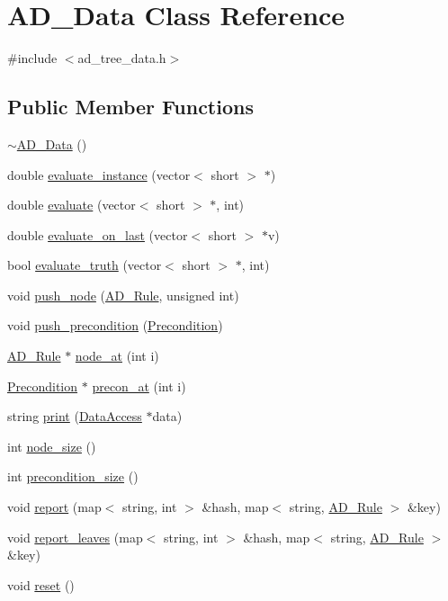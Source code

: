 \hypertarget{classAD__Data}{
\section{AD\_\-Data Class Reference}
\label{classAD__Data}
}


{\ttfamily \#include $<$ad\_\-tree\_\-data.h$>$}

\subsection*{Public Member Functions}
\begin{DoxyCompactItemize}
\item 
\hyperlink{classAD__Data_a57f2d885255d7c1cc4a58ef0b25dc70f}{$\sim$AD\_\-Data} ()
\item 
double \hyperlink{classAD__Data_a27ee25978ea9544be17a0d63a2381cce}{evaluate\_\-instance} (vector$<$ short $>$ $\ast$)
\item 
double \hyperlink{classAD__Data_ad4c7e18955e518adb3816ad59929a3f5}{evaluate} (vector$<$ short $>$ $\ast$, int)
\item 
double \hyperlink{classAD__Data_a579358913b3809af2c7eed5df350d4da}{evaluate\_\-on\_\-last} (vector$<$ short $>$ $\ast$v)
\item 
bool \hyperlink{classAD__Data_a69c88748173e40b02bf2982716a0c324}{evaluate\_\-truth} (vector$<$ short $>$ $\ast$, int)
\item 
void \hyperlink{classAD__Data_aefd8ae5332cb9ff0014f69171deee8b6}{push\_\-node} (\hyperlink{classAD__Rule}{AD\_\-Rule}, unsigned int)
\item 
void \hyperlink{classAD__Data_a20919e580c8921096c076bb1c34ddb84}{push\_\-precondition} (\hyperlink{classPrecondition}{Precondition})
\item 
\hyperlink{classAD__Rule}{AD\_\-Rule} $\ast$ \hyperlink{classAD__Data_accb4490817736df74615ef8d61d5e054}{node\_\-at} (int i)
\item 
\hyperlink{classPrecondition}{Precondition} $\ast$ \hyperlink{classAD__Data_ad6a0dc0a908f42be275f05f2f2e33ade}{precon\_\-at} (int i)
\item 
string \hyperlink{classAD__Data_a0fafd366f2e3244c3a1a4b21dbdca2e3}{print} (\hyperlink{classDataAccess}{DataAccess} $\ast$data)
\item 
int \hyperlink{classAD__Data_aff7871e090a2a6139be41a402c595e23}{node\_\-size} ()
\item 
int \hyperlink{classAD__Data_a7c736350355a4030c96d526cbfaa6078}{precondition\_\-size} ()
\item 
void \hyperlink{classAD__Data_a3f3b8cda87456d54814498a9c636ee4c}{report} (map$<$ string, int $>$ \&hash, map$<$ string, \hyperlink{classAD__Rule}{AD\_\-Rule} $>$ \&key)
\item 
void \hyperlink{classAD__Data_a94ff3af2d77f31a1b872d9bf621a05cd}{report\_\-leaves} (map$<$ string, int $>$ \&hash, map$<$ string, \hyperlink{classAD__Rule}{AD\_\-Rule} $>$ \&key)
\item 
void \hyperlink{classAD__Data_a0297c2b6c70f703bed9055ec8536292c}{reset} ()
\end{DoxyCompactItemize}


